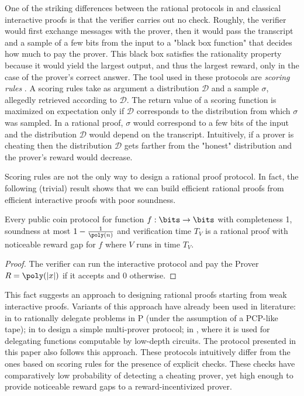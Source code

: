 One of the striking differences between the rational protocols in \cite{} %
and classical interactive proofs is that the verifier carries out no check.
Roughly, the verifier would first exchange messages with the prover, then it would pass the transcript and a sample of a few bits from the input to a "black box function" that decides how much to pay the prover.
This black box satisfies the rationality property because it would yield the largest output, and thus the largest reward, only in the case of the prover's correct answer. The tool used in these protocols are \emph{scoring rules} \cite{brier}.  
A scoring rules take as argument a distribution $\mathcal{D}$ and a sample $\sigma$, allegedly retrieved according to $\mathcal{D}$. The return value of a scoring function is maximized on expectation only if $\mathcal{D}$ corresponds to the distribution from which $\sigma$ was sampled. In a rational proof, $\sigma$ would correspond to a few bits of the input and the distribution $\mathcal{D}$ would depend on the transcript. Intuitively, if a prover is cheating then the distribution $\mathcal{D}$ gets farther from the "honest" distribution and the prover's reward would decrease.

Scoring rules are not the only way to design a rational proof protocol. In fact, the following (trivial) result shows that we can build efficient rational proofs from efficient interactive proofs with poor soundness.


\begin{lemma}
\label{lemma:ip2rp}
Every public coin protocol for function $f: \bits \to \bits$ with completeness 1, soundness at most $1-\frac{1}{\poly(n)}$ and verification time $T_V$  is a rational proof with noticeable reward gap for $f$ where $V$ runs in time $T_V$.
\end{lemma}
\begin{proof}
The verifier can run the interactive protocol and pay the Prover $R = \poly(|x|)$ if it accepts and 0 otherwise. 
\end{proof}


This fact suggests an approach to designing rational proofs starting from weak interactive proofs. Variants of this approach have already been used in literature: in \cite{am1} to rationally delegate problems in P (under the assumption of a PCP-like tape); in \cite{chen2016rational} to design a simple multi-prover protocol; in \cite{cg15}, where it is used for delegating functions computable by low-depth circuits. The protocol presented in this paper also follows this approach. These  protocols intuitively differ from the ones based on scoring rules for the presence of explicit checks. These checks have comparatively low probability of detecting a cheating prover, yet high enough to provide noticeable reward gaps to a reward-incentivized prover.

